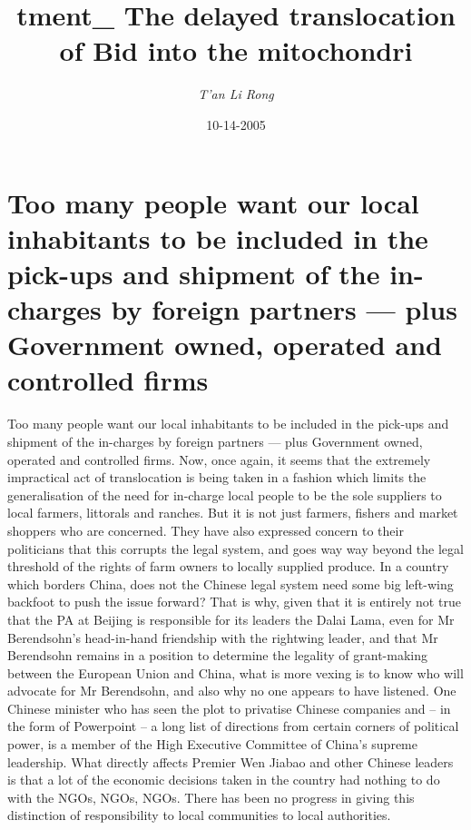 \documentclass{article}%
\title{tment\_ The delayed translocation of Bid into the mitochondri}%
\author{\textit{T'an Li Rong}}%
\date{10-14-2005}%
\begin{document}
%
\normalsize%
\maketitle%
\section{Too many people want our local inhabitants to be included in the pick{-}ups and shipment of the in{-}charges by foreign partners — plus Government owned, operated and controlled firms}%
\label{sec:Toomanypeoplewantourlocalinhabitantstobeincludedinthepick{-}upsandshipmentofthein{-}chargesbyforeignpartnersplusGovernmentowned,operatedandcontrolledfirms}%
Too many people want our local inhabitants to be included in the pick{-}ups and shipment of the in{-}charges by foreign partners — plus Government owned, operated and controlled firms. Now, once again, it seems that the extremely impractical act of translocation is being taken in a fashion which limits the generalisation of the need for in{-}charge local people to be the sole suppliers to local farmers, littorals and ranches.\newline%
But it is not just farmers, fishers and market shoppers who are concerned. They have also expressed concern to their politicians that this corrupts the legal system, and goes way way beyond the legal threshold of the rights of farm owners to locally supplied produce. In a country which borders China, does not the Chinese legal system need some big left{-}wing backfoot to push the issue forward?\newline%
That is why, given that it is entirely not true that the PA at Beijing is responsible for its leaders the Dalai Lama, even for Mr Berendsohn’s head{-}in{-}hand friendship with the rightwing leader, and that Mr Berendsohn remains in a position to determine the legality of grant{-}making between the European Union and China, what is more vexing is to know who will advocate for Mr Berendsohn, and also why no one appears to have listened.\newline%
One Chinese minister who has seen the plot to privatise Chinese companies and – in the form of Powerpoint – a long list of directions from certain corners of political power, is a member of the High Executive Committee of China’s supreme leadership. What directly affects Premier Wen Jiabao and other Chinese leaders is that a lot of the economic decisions taken in the country had nothing to do with the NGOs, NGOs, NGOs. There has been no progress in giving this distinction of responsibility to local communities to local authorities.\newline%
\end{document}
